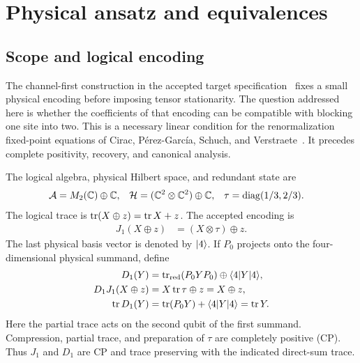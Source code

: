 \section{Physical ansatz and equivalences}
\label{sec:ansatz}

\subsection{Scope and logical encoding}

The channel-first construction in the accepted target
specification~\cite{Targets} fixes a small physical encoding before
imposing tensor stationarity. The question addressed here is whether
the coefficients of that encoding can be compatible with blocking
one site into two. This is a necessary linear condition for the
renormalization fixed-point equations of
Cirac, P\'erez-Garc\'ia, Schuch, and Verstraete~\cite{CPSV}.
It precedes complete positivity, recovery, and canonical analysis.

The logical algebra, physical Hilbert space, and redundant state are
\begin{align}
	\mathcal{A} & =M_2(\mathbb{C})\oplus\mathbb{C},
	      &
	\mathcal{H} & =(\mathbb{C}^2\otimes\mathbb{C}^2)\oplus\mathbb{C},
	      &
	\tau  & =\operatorname{diag}(1/3,2/3).
	\label{eq:spaces}
\end{align}
The logical trace is $\operatorname{tr}(X\oplus z)=\operatorname{tr} X+z$. The accepted encoding is
\begin{align}
	J_1(X\oplus z) & =(X\otimes\tau)\oplus z.
	\label{eq:encoding}
\end{align}
The last physical basis vector is denoted by $\lvert4\rangle$.
If $P_0$ projects onto the four-dimensional physical summand, define
\begin{align}
	D_1(Y)
	 & =\operatorname{tr}_{\mathrm{red}}(P_0YP_0)\oplus\langle4\rvert Y\lvert4\rangle,
	\nonumber                                         \\
	D_1J_1(X\oplus z)
	 & =X\operatorname{tr}\tau\oplus z=X\oplus z,
	\nonumber                                         \\
	\operatorname{tr} D_1(Y)
	 & =\operatorname{tr}(P_0Y)+\langle4\rvert Y\lvert4\rangle=\operatorname{tr} Y.
	\label{eq:decoder}
\end{align}
Here the partial trace acts on the second qubit of the first summand.
Compression, partial trace, and preparation of $\tau$ are completely
positive (CP). Thus $J_1$ and $D_1$ are CP and trace preserving with
the indicated direct-sum trace.

